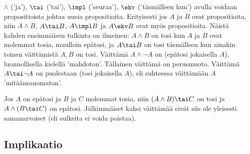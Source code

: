  $\wedge$ ('ja'), $\tai$ ('tai'), $\impl$ ('seuraa'), $\ekv$
('täsmälleen kun') avulla voidaan propositioista johtaa uusia propositioita. Erityisesti jos 
$A$ ja $B$ ovat propositioita, niin $A \wedge B$, $A \tai B$, $A \impl B$ ja $A \ekv B$ ovat
myös propositioita. Näistä kahden ensimmäisen tulkinta on  ilmeinen: $A \wedge B$ on tosi kun
$A$ ja $B$ ovat molemmat tosia, muulloin epätosi, ja $A \tai B$ on tosi täsmälleen kun ainakin
toinen  väittämistä $A,B$ on tosi.  Väittämä $A \wedge \neg A$ on  
(epätosi jokaisella $A$), luonnollisella kielellä 'mahdoton'. Tällainen väittämä on
 perusmuoto. Väittämä $A \tai \neg A$ on puolestaan 
 (tosi jokaisella $A$), eli suhteessa väittämään $A$ 'mitäänsanomaton'.
\begin{Exa} Jos $A$ on epätosi ja $B$ ja $C$ molemmat tosia, niin $(A \wedge B) \tai C$ on tosi
ja $A \wedge (B \tai C)$ on epätosi. Jälkimmäiset kaksi väittämää eivät siis ole yleisesti 
samanarvoiset (eli sulkeita ei voida poistaa). \loppu \end{Exa}

\subsection{Implikaatio}

